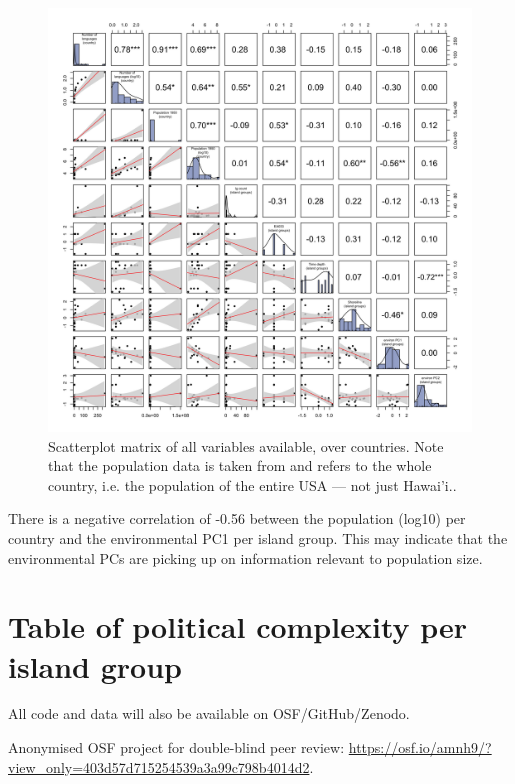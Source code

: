 \documentclass[12pt,letterpaper]{article}
\begin{document}
\begin{figure}[ht]
    \includegraphics[width=\textwidth]{latex/SPLOM_country_all_variables}
\caption{Scatterplot matrix of all variables available, over countries. Note that the population data is taken from \citet{UN_pop} and refers to the whole country, i.e. the population of the entire USA --- not just Hawai'i..}
\label{appendix_SPLOM_country_all_variables}
\end{figure}


There is a negative correlation of -0.56 between the population (log10) per country and the environmental PC1 per island group. This may indicate that the environmental PCs are picking up on information relevant to population size.

\FloatBarrier
\newpage

\section{Table of political complexity per island group }
\singlespacing
All code and data will also be available on OSF/GitHub/Zenodo.

Anonymised OSF project for double-blind peer review: \url{https://osf.io/amnh9/?view_only=403d57d715254539a3a99c798b4014d2}.

 \begin{landscape}
     
\label{appendix_pol_complex}


 \end{landscape}
\end{document}
